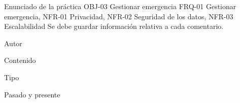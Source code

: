 {\reportauthors}
{Enunciado de la práctica}
{OBJ-03 Gestionar emergencia}
{FRQ-01 Gestionar emergencia, NFR-01 Privacidad, NFR-02 Seguridad de los datos, NFR-03 Escalabilidad}
{Se debe guardar información relativa a cada comentario.}
{
\item{Autor}
\item{Contenido}
\item{Tipo}
}
{Pasado y presente}

